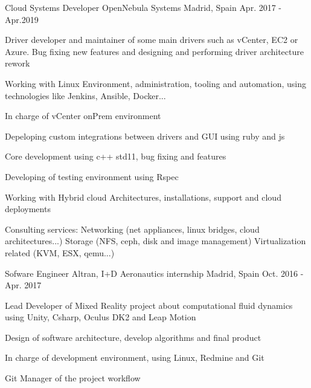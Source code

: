 \begin{cventries}
  \cventry
    {Cloud Systems Developer} %
    {OpenNebula Systems} %
    {Madrid, Spain} %
    {Apr. 2017 - Apr.2019} %
    {
      \begin{cvitems} %
        \item {Driver developer and maintainer of some main drivers such as vCenter, EC2 or Azure. Bug fixing new features and designing and performing driver architecture rework}
        \item {Working with Linux Environment, administration, tooling and automation, using technologies like Jenkins, Ansible, Docker...}
        \item {In charge of vCenter onPrem environment}
        \item {Depeloping custom integrations between drivers and GUI using ruby and js}
        \item {Core development using c++ std11, bug fixing and features}
        \item {Developing of testing environment using Rspec}
        \item {Working with Hybrid cloud Architectures, installations, support and cloud deployments}
        \item {Consulting services: Networking (net appliances, linux bridges, cloud architectures...) Storage (NFS, ceph, disk and image management) Virtualization related (KVM, ESX, qemu...)}
      \end{cvitems}
    }

  \cventry
    {Sofware Engineer} %
    {Altran, I+D Aeronautics internship} %
    {Madrid, Spain} %
    {Oct. 2016 - Apr. 2017} %
    {
      \begin{cvitems} %
        \item {Lead Developer of Mixed Reality project about computational fluid dynamics using Unity, Csharp, Oculus DK2 and Leap Motion}
        \item {Design of software architecture, develop algorithms and final product}
        \item {In charge of development environment, using Linux, Redmine and Git}
        \item {Git Manager of the project workflow}
      \end{cvitems}
    }


\end{cventries}
